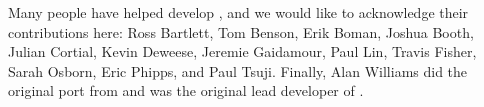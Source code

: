 Many people have helped develop \ifpacktwo{}, and we would like to acknowledge
their contributions here: Ross Bartlett, Tom Benson, Erik Boman, Joshua Booth,
Julian Cortial, Kevin Deweese, Jeremie Gaidamour, Paul Lin, Travis Fisher, Sarah
Osborn, Eric Phipps, and Paul Tsuji. Finally, Alan Williams did the original
port from \ifpack{} and was the original lead developer of \ifpacktwo{}.
